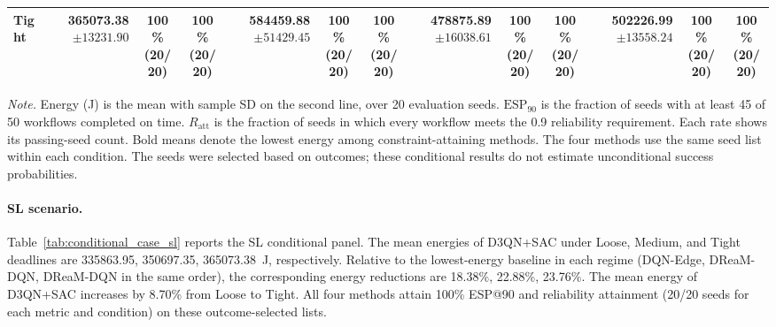 \begin{table}[!t]
\begin{tabular}{@{}l*{4}{rcc}@{}}
Tight & \shortstack[r]{\textbf{365073.38}\\$\pm 13231.90$} & \shortstack[c]{100\%\\(20/20)} & \shortstack[c]{100\%\\(20/20)} & \shortstack[r]{584459.88\\$\pm 51429.45$} & \shortstack[c]{100\%\\(20/20)} & \shortstack[c]{100\%\\(20/20)} & \shortstack[r]{478875.89\\$\pm 16038.61$} & \shortstack[c]{100\%\\(20/20)} & \shortstack[c]{100\%\\(20/20)} & \shortstack[r]{502226.99\\$\pm 13558.24$} & \shortstack[c]{100\%\\(20/20)} & \shortstack[c]{100\%\\(20/20)} \\
\bottomrule
\end{tabular}
\par\vspace{3pt}
\parbox{\textwidth}{\footnotesize
\textit{Note.} Energy (J) is the mean with sample SD on the second line, over 20 evaluation seeds.
$\mathrm{ESP}_{90}$ is the fraction of seeds with at least 45 of 50 workflows completed on time.
$R_{\mathrm{att}}$ is the fraction of seeds in which every workflow meets the 0.9 reliability requirement.
Each rate shows its passing-seed count. Bold means denote the lowest energy among constraint-attaining methods.
The four methods use the same seed list within each condition.
The seeds were selected based on outcomes; these conditional results do not estimate unconditional success probabilities.}
\endgroup
\end{table}

\paragraph{SL scenario.}
Table~\ref{tab:conditional_case_sl} reports the SL conditional panel. The mean energies of D3QN+SAC under Loose, Medium, and Tight deadlines are 335863.95, 350697.35, 365073.38~J, respectively. Relative to the lowest-energy baseline in each regime (DQN-Edge, DReaM-DQN, DReaM-DQN in the same order), the corresponding energy reductions are 18.38\%, 22.88\%, 23.76\%. The mean energy of D3QN+SAC increases by 8.70\% from Loose to Tight. All four methods attain 100\% ESP@90 and reliability attainment (20/20 seeds for each metric and condition) on these outcome-selected lists.

